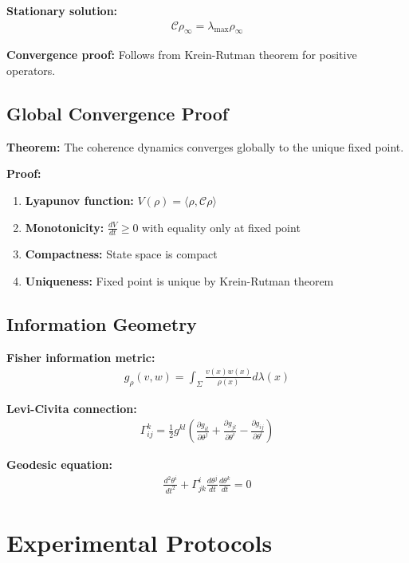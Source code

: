\documentclass[11pt]{article}
\theoremstyle{definition}
\newcommand{\coherence}{\mathcal{C}}
\newcommand{\configspace}{\Sigma}
\newcommand{\density}{\rho}
\newcommand{\eigenvalue}{\lambda}
\begin{document}
\textbf{Stationary solution:}
\begin{align}
\coherence\density_\infty = \eigenvalue_{\max} \density_\infty
\end{align}

\textbf{Convergence proof:} Follows from Krein-Rutman theorem for positive operators.

\subsection{Global Convergence Proof}

\textbf{Theorem:} The coherence dynamics converges globally to the unique fixed point.

\textbf{Proof:}
\begin{enumerate}
\item \textbf{Lyapunov function:} $V(\density) = \langle \density, \coherence\density \rangle$
\item \textbf{Monotonicity:} $\frac{dV}{dt} \geq 0$ with equality only at fixed point
\item \textbf{Compactness:} State space is compact
\item \textbf{Uniqueness:} Fixed point is unique by Krein-Rutman theorem
\end{enumerate}

\subsection{Information Geometry}

\textbf{Fisher information metric:}
\begin{align}
g_\density(v,w) = \int_{\configspace} \frac{v(x) w(x)}{\density(x)} d\lambda(x)
\end{align}

\textbf{Levi-Civita connection:}
\begin{align}
\Gamma_{ij}^k = \frac{1}{2} g^{kl} \left( \frac{\partial g_{il}}{\partial \theta^j} + \frac{\partial g_{jl}}{\partial \theta^i} - \frac{\partial g_{ij}}{\partial \theta^l} \right)
\end{align}

\textbf{Geodesic equation:}
\begin{align}
\frac{d^2\theta^i}{dt^2} + \Gamma_{jk}^i \frac{d\theta^j}{dt} \frac{d\theta^k}{dt} = 0
\end{align}

\section{Experimental Protocols}
\end{document}
